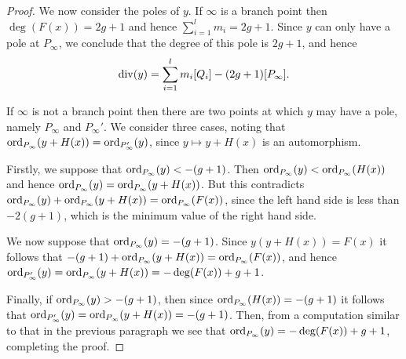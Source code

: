 \begin{proof}
    We now consider the poles of $y$.
    If $\infty$ is a branch point then $\deg(F(x)) = 2g+1$ and hence $\sum_{i=1}^l m_i = 2g+1$.
    Since $y$ can only have a pole at $P_\infty$, we conclude that the degree of this pole is $2g+1$, and hence
        \[
        \operatorname{div}(y) = \sum_{i=1}^l m_i [Q_i] - (2g+1)[P_\infty].
        \]
    
    If $\infty$ is not a branch point then there are two points at which $y$ may have a pole, namely $P_\infty$ and $P_\infty'$.
    We consider three cases, noting that $\operatorname{ord}_{P_\infty}(y + H(x)) = \operatorname{ord}_{P_\infty'}(y)$, since $y \mapsto y+H(x)$ is an automorphism.
    
    
    Firstly, we suppose that $\operatorname{ord}_{P_\infty}(y) < -(g+1)$.
    Then $\operatorname{ord}_{P_\infty}(y) < \operatorname{ord}_{P_\infty}(H(x))$ and hence $ \operatorname{ord}_{P_\infty}(y) = \operatorname{ord}_{P_\infty}(y+H(x))$.
    But this contradicts $\operatorname{ord}_{P_\infty}(y) + \operatorname{ord}_{P_\infty}(y+H(x)) = \operatorname{ord}_{P_\infty}(F(x))$, since the left hand side is less than $-2(g+1)$, which is the minimum value of the right hand side.
    
    We now suppose that $\operatorname{ord}_{P_\infty} (y) = -(g+1)$. Since $y(y+H(x)) = F(x)$ it follows that $-(g+1) + \operatorname{ord}_{P_\infty}(y+H(x)) = \operatorname{ord}_{P_\infty}(F(x))$, and hence $\operatorname{ord}_{P_\infty'}(y) = \operatorname{ord}_{P_\infty}(y+H(x)) = -\deg(F(x)) + g + 1$.
    
    Finally, if $\operatorname{ord}_{P_\infty}(y) > -(g+1)$, then since $\operatorname{ord}_{P_\infty}(H(x)) = -(g+1)$ it follows that $\operatorname{ord}_{P_\infty'}(y) = \operatorname{ord}_{P_\infty} (y+H(x)) = -(g+1)$.
    Then, from a computation similar to that in the previous paragraph we see that $\operatorname{ord}_{P_\infty}(y) = -\deg(F(x)) + g +1$, completing the proof.
    \end{proof}


